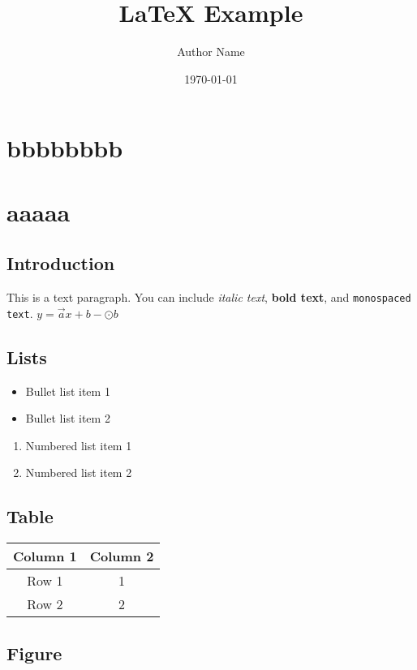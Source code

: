 \documentclass{article}
\title{LaTeX Example}
\author{Author Name}
\date{\today}
\begin{document}
\maketitle

\chapter{bbbbbbbb}

\chapter*{aaaaa}
\section{Introduction}

This is a text paragraph. You can include \textit{italic text}, \textbf{bold text}, and \texttt{monospaced text}. $y = \vec a x + b - \odot b$

\section{Lists}

\begin{itemize}
    \item Bullet list item 1
    \item Bullet list item 2
\end{itemize}

\begin{enumerate}
    \item Numbered list item 1
    \item Numbered list item 2
\end{enumerate}

\section{Table}

\begin{tabular}{|c|c|}
    \hline
    Column 1 & Column 2 \\
    \hline
    Row 1 & 1 \\
    Row 2 & 2 \\
    \hline
\end{tabular}

\section{Figure}
\end{document}
